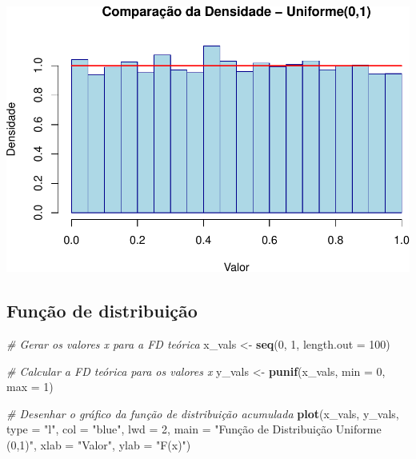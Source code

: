 \documentclass[
]{book}
\newenvironment{Shaded}{\begin{snugshade}}{\end{snugshade}}
\newcommand{\AttributeTok}[1]{\textcolor[rgb]{0.13,0.29,0.53}{#1}}
\newcommand{\CommentTok}[1]{\textcolor[rgb]{0.56,0.35,0.01}{\textit{#1}}}
\newcommand{\DecValTok}[1]{\textcolor[rgb]{0.00,0.00,0.81}{#1}}
\newcommand{\FunctionTok}[1]{\textcolor[rgb]{0.13,0.29,0.53}{\textbf{#1}}}
\newcommand{\NormalTok}[1]{#1}
\newcommand{\OtherTok}[1]{\textcolor[rgb]{0.56,0.35,0.01}{#1}}
\newcommand{\StringTok}[1]{\textcolor[rgb]{0.31,0.60,0.02}{#1}}
\begin{document}
\includegraphics{introR_files/figure-latex/unnamed-chunk-271-1.pdf}

\subsection{Função de distribuição}\label{funuxe7uxe3o-de-distribuiuxe7uxe3o-2}

\begin{Shaded}
\begin{Highlighting}[]
\CommentTok{\# Gerar os valores x para a FD teórica}
\NormalTok{x\_vals }\OtherTok{\textless{}{-}} \FunctionTok{seq}\NormalTok{(}\DecValTok{0}\NormalTok{, }\DecValTok{1}\NormalTok{, }\AttributeTok{length.out =} \DecValTok{100}\NormalTok{)}

\CommentTok{\# Calcular a FD teórica para os valores x}
\NormalTok{y\_vals }\OtherTok{\textless{}{-}} \FunctionTok{punif}\NormalTok{(x\_vals, }\AttributeTok{min =} \DecValTok{0}\NormalTok{, }\AttributeTok{max =} \DecValTok{1}\NormalTok{)}

\CommentTok{\# Desenhar o gráfico da função de distribuição acumulada}
\FunctionTok{plot}\NormalTok{(x\_vals, y\_vals, }\AttributeTok{type =} \StringTok{"l"}\NormalTok{, }
     \AttributeTok{col =} \StringTok{"blue"}\NormalTok{, }\AttributeTok{lwd =} \DecValTok{2}\NormalTok{, }
     \AttributeTok{main =} \StringTok{"Função de Distribuição Uniforme (0,1)"}\NormalTok{,}
     \AttributeTok{xlab =} \StringTok{"Valor"}\NormalTok{, }\AttributeTok{ylab =} \StringTok{"F(x)"}\NormalTok{)}
\end{Highlighting}
\end{Shaded}
\end{document}
